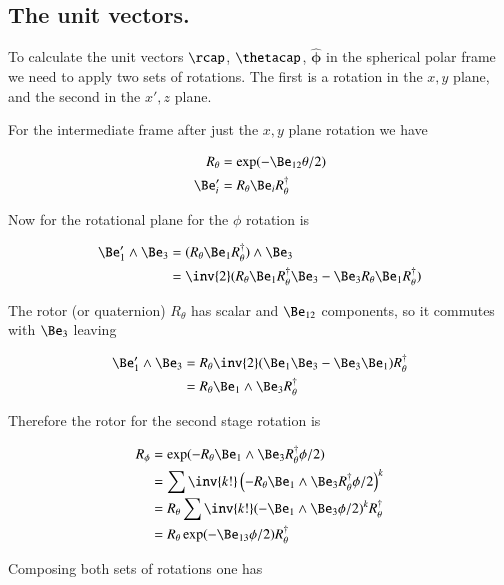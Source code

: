 \documentclass{article}
\newcommand{\phicap}[0]{\hat{\boldsymbol{\phi}}}
\begin{document}
\subsection{ The unit vectors. }

To calculate the unit vectors $\rcap$, $\thetacap$, $\phicap$ in the spherical polar frame we need to apply two sets of rotations.  The first is a rotation 
in the $x,y$ plane, and the second in the $x', z$ plane.

For the intermediate frame after just the $x,y$ plane rotation we have

\begin{align*}
R_\theta &= \exp(-\Be_{12}\theta/2) \\
\Be_i' &= R_\theta \Be_i R_\theta^\dagger
\end{align*}

Now for the rotational plane for the $\phi$ rotation is

\begin{align*}
\Be_1' \wedge \Be_3 
&= (R_\theta \Be_1 R_\theta^\dagger) \wedge \Be_3 \\
&= \inv{2} ( R_\theta \Be_1 R_\theta^\dagger \Be_3 - \Be_3 R_\theta \Be_1 R_\theta^\dagger ) \\
\end{align*}

The rotor (or quaternion) $R_\theta$ has scalar and $\Be_{12}$ components, so it commutes with $\Be_3$ leaving

\begin{align*}
\Be_1' \wedge \Be_3 
&= R_\theta \inv{2} ( \Be_1 \Be_3 - \Be_3 \Be_1 ) R_\theta^\dagger \\
&= R_\theta \Be_1 \wedge \Be_3 R_\theta^\dagger \\
\end{align*}

Therefore the rotor for the second stage rotation is

\begin{align*}
R_\phi 
&= \exp( - R_\theta \Be_1 \wedge \Be_3 R_\theta^\dagger \phi/2 ) \\
&= \sum \inv{k!} \left( - R_\theta \Be_1 \wedge \Be_3 R_\theta^\dagger \phi/2 \right)^k \\
&= R_\theta \sum \inv{k!} ( - \Be_1 \wedge \Be_3 \phi/2 )^k R_\theta^\dagger \\
&= R_\theta \exp( - \Be_{13} \phi/2 ) R_\theta^\dagger \\
\end{align*}

Composing both sets of rotations one has
\end{document}
